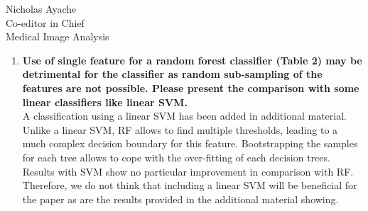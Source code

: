\documentclass{letter}
\begin{document}
\begin{letter}{Nicholas Ayache \\ Co-editor in Chief \\ Medical Image Analysis}
\begin{enumerate}
    are obtained using our normalization approach, showing the importance of
    this step. We added a discussion in p.~23/l.~388 regarding the
    semi-quantitative approach and entire enhanced signal
    classification. The semi-quantitative approach reduces the number
    of features to analyze, speeding up the classification. However,
    it relies on the curve fitting which is also time consuming and
    might fail.
  \item \textbf{Use of single feature for a random forest classifier
      (Table 2) may be detrimental for the classifier as random
      sub-sampling of the features are not possible. Please present
      the comparison with some linear classifiers like linear SVM.}\\
    A classification using a linear SVM has been added in additional
    material.
    Unlike a linear SVM, RF allows to find multiple thresholds,
    leading to a much complex decision boundary for this
    feature. Bootstrapping the samples for each tree allows to cope
    with the over-fitting of each decision trees. Results with SVM
    show no particular improvement in comparison with RF. Therefore,
    we do not
    think that including a linear SVM will be beneficial for the paper
    as are the results provided in the additional material showing.
  \end{enumerate}


\end{letter}
\end{document}

